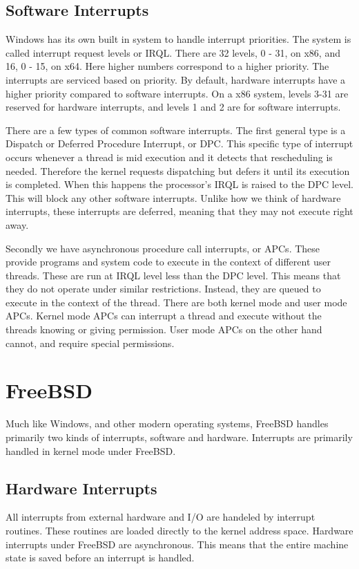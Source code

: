 \documentclass[letterpaper,10pt,titlepage,draftclsnofoot,onecolumn]{IEEEtran}
\begin{document}
\subsection{Software Interrupts}
Windows has its own built in system to handle interrupt priorities. The system is called interrupt request levels or IRQL. There are 32 levels, 0 - 31, on x86, and 16, 0 - 15, on x64. Here higher numbers correspond to a higher priority. The interrupts are serviced based on priority. By default, hardware interrupts have a higher priority compared to software interrupts. On a x86 system, levels 3-31 are reserved for hardware interrupts, and levels 1 and 2 are for software interrupts. \cite{windows}

There are a few types of common software interrupts. The first general type is a Dispatch or Deferred Procedure Interrupt, or DPC. This specific type of interrupt occurs whenever a thread is mid execution and it detects that rescheduling is needed. Therefore the kernel requests dispatching but defers it until its execution is completed. When this happens the processor's IRQL is raised to the DPC level. \cite{windows} This will block any other software interrupts. Unlike how we think of hardware interrupts, these interrupts are deferred, meaning that they may not execute right away. 

Secondly we have asynchronous procedure call interrupts, or APCs. These provide programs and system code to execute in the context of different user threads. These are run at IRQL level less than the DPC level. This means that they do not operate under similar restrictions. Instead, they are queued to execute in the context of the thread. There are both kernel mode and user mode APCs. Kernel mode APCs can interrupt a thread and execute without the threads knowing or giving permission. User mode APCs on the other hand cannot, and require special permissions. \cite{windows}

\section{FreeBSD}
Much like Windows, and other modern operating systems, FreeBSD handles primarily two kinds of interrupts, software and hardware. Interrupts are primarily handled in kernel mode under FreeBSD. 

\subsection{Hardware Interrupts}
All interrupts from external hardware and I/O are handeled by interrupt routines. These routines are loaded directly to the kernel address space. Hardware interrupts under FreeBSD are asynchronous. This means that the entire machine state is saved before an interrupt is handled. 
\end{document}
